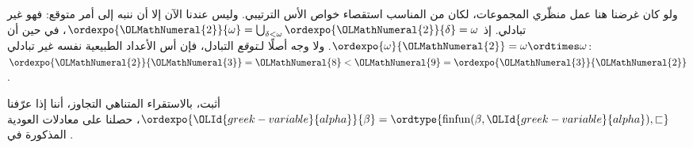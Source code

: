 \documentclass[../../../include/open-logic-section]{subfiles}
\begin{document}
ولو كان غرضنا هنا عمل منظّري المجموعات، لكان من المناسب استقصاء خواص
الأس الترتيبي. وليس عندنا الآن إلا أن ننبه إلى أمر متوقع: فهو غير
تبادلي. إذ
$\ordexpo{{\OLMathNumeral{2}}}{\omega} =
\bigcup_{\delta < \omega}\ordexpo{{\OLMathNumeral{2}}}{\delta} = \omega$، في حين أن
$\ordexpo{\omega}{{\OLMathNumeral{2}}} = \omega \ordtimes \omega$. ولا وجه أصلًا
لـ\emph{توقع} التبادل، فإن أس الأعداد الطبيعية نفسه غير تبادلي:
$\ordexpo{{\OLMathNumeral{2}}}{{\OLMathNumeral{3}}} = {\OLMathNumeral{8}} < {\OLMathNumeral{9}} = \ordexpo{{\OLMathNumeral{3}}}{{\OLMathNumeral{2}}}$.

\begin{prob}
أثبت، بالاستقراء المتناهي التجاوز، أننا إذا عرّفنا
$\ordexpo{{\OLId{greek-variable}{alpha}}}{\beta} =
\ordtype{\text{finfun}(\beta, {\OLId{greek-variable}{alpha}}), \sqsubset}$، حصلنا على
معادلات العودية المذكورة في
.
\end{prob}
\end{document}
